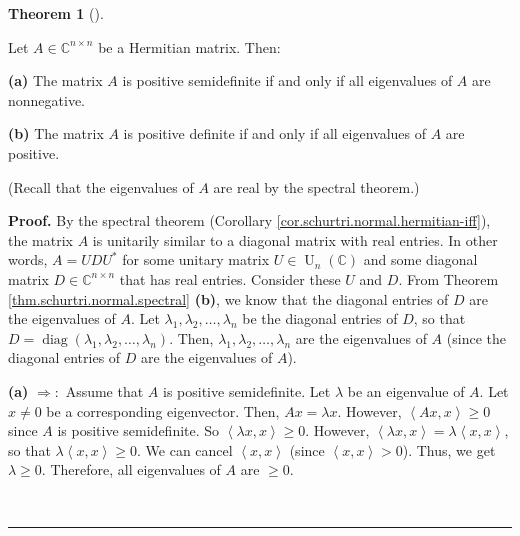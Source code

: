 \documentclass[numbers=enddot,12pt,final,onecolumn,notitlepage]{scrartcl}%
\numberwithin{exer}{subsection}
\theoremstyle{definition}
\newtheorem{theo}{Theorem}[subsection]
\newenvironment{theorem}[1][]
{\begin{theo}[#1]\begin{leftbar}}
{\end{leftbar}\end{theo}}
\newenvironment{proof}[1][Proof]{\noindent\textbf{#1.} }{\ \rule{0.5em}{0.5em}}
\begin{document}
\begin{theorem}
\label{thm.herm.pos-semdef-using-evals}Let $A\in\mathbb{C}^{n\times n}$ be a
Hermitian matrix. Then: \medskip

\textbf{(a)} The matrix $A$ is positive semidefinite if and only if all
eigenvalues of $A$ are nonnegative. \medskip

\textbf{(b)} The matrix $A$ is positive definite if and only if all
eigenvalues of $A$ are positive. \medskip

(Recall that the eigenvalues of $A$ are real by the spectral theorem.)
\end{theorem}

\begin{proof}
By the spectral theorem (Corollary \ref{cor.schurtri.normal.hermitian-iff}),
the matrix $A$ is unitarily similar to a diagonal matrix with real entries. In
other words, $A=UDU^{\ast}$ for some unitary matrix $U\in\operatorname*{U}%
\nolimits_{n}\left(  \mathbb{C}\right)  $ and some diagonal matrix
$D\in\mathbb{C}^{n\times n}$ that has real entries. Consider these $U$ and
$D$. From Theorem \ref{thm.schurtri.normal.spectral} \textbf{(b)}, we know
that the diagonal entries of $D$ are the eigenvalues of $A$. Let $\lambda
_{1},\lambda_{2},\ldots,\lambda_{n}$ be the diagonal entries of $D$, so that
$D=\operatorname*{diag}\left(  \lambda_{1},\lambda_{2},\ldots,\lambda
_{n}\right)  $. Then, $\lambda_{1},\lambda_{2},\ldots,\lambda_{n}$ are the
eigenvalues of $A$ (since the diagonal entries of $D$ are the eigenvalues of
$A$).

\textbf{(a)} $\Longrightarrow:$ Assume that $A$ is positive semidefinite. Let
$\lambda$ be an eigenvalue of $A$. Let $x\neq0$ be a corresponding
eigenvector. Then, $Ax=\lambda x$. However, $\left\langle Ax,x\right\rangle
\geq0$ since $A$ is positive semidefinite. So $\left\langle \lambda
x,x\right\rangle \geq0$. However, $\left\langle \lambda x,x\right\rangle
=\lambda\left\langle x,x\right\rangle $, so that $\lambda\left\langle
x,x\right\rangle \geq0$. We can cancel $\left\langle x,x\right\rangle $ (since
$\left\langle x,x\right\rangle >0$). Thus, we get $\lambda\geq0$. Therefore,
all eigenvalues of $A$ are $\geq0$.


\end{proof}
\end{document}

